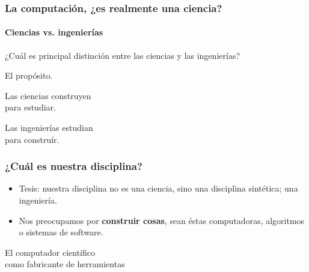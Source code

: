 \documentclass[spanish]{beamer}
\begin{document}
\begin{frame}
  \frametitle{La computación, ¿es realmente una ciencia?}
  \framesubtitle{Ciencias vs. ingenierías}

  \pause

  ¿Cuál es principal distinción entre las ciencias y las ingenierías?

  \pause

  \vspace{2em}
  El propósito.
\end{frame}

\begin{frame}
  \begin{center}
    \Huge{
      Las ciencias construyen \\
      para estudiar.

      \vspace{2em}

      Las ingenierías estudian \\
      para construír.
    }
  \end{center}
\end{frame}

\begin{frame}
  \frametitle{¿Cuál es nuestra disciplina?}

  \pause

  \begin{itemize}
    \item Tesis: nuestra disciplina no es una ciencia, sino una disciplina
      sintética; una ingeniería.
    \pause

    \item Nos preocupamos por \textbf{construir cosas}, sean éstas
      computadoras, algoritmos o sistemas de software.
  \end{itemize}
\end{frame}

\begin{frame}
  \begin{center}
    \Huge{
      El computador científico \\
      como fabricante de herramientas
    }
  \end{center}
\end{frame}
\end{document}
